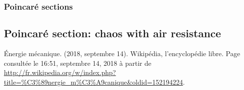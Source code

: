 \documentclass[a4paper,12pt,twoside]{article}
\begin{document}
\subsubsection{Poincaré sections}


\subsection{Poincaré section: chaos with air resistance}


\begin{thebibliography}{99}
	 Énergie mécanique. (2018, septembre 14). Wikipédia, l'encyclopédie libre. Page consultée le 16:51, septembre 14, 2018 à partir de \url{http://fr.wikipedia.org/w/index.php?title=%C3%89nergie_m%C3%A9canique&oldid=152194224}.

\end{thebibliography}
\end{document}
